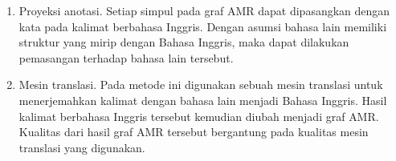 \begin{enumerate}
  \item Proyeksi anotasi.
  Setiap simpul pada graf \gls{AMR} dapat dipasangkan dengan kata pada kalimat berbahasa Inggris.
  Dengan asumsi bahasa lain memiliki struktur yang mirip dengan Bahasa Inggris, maka dapat dilakukan pemasangan terhadap bahasa lain tersebut.


  \item Mesin translasi.
  Pada metode ini digunakan sebuah mesin translasi untuk menerjemahkan kalimat dengan bahasa lain menjadi Bahasa Inggris.
  Hasil kalimat berbahasa Inggris tersebut kemudian diubah menjadi graf \gls{AMR}.
  Kualitas dari hasil graf \gls{AMR} tersebut bergantung pada kualitas mesin translasi yang digunakan.

\end{enumerate}

